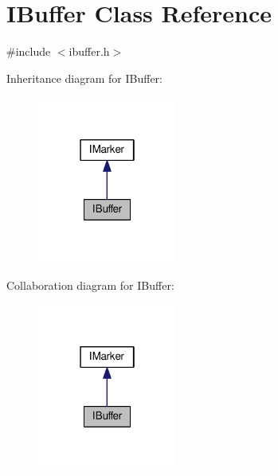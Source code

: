 \hypertarget{class_i_buffer}{\section{I\-Buffer Class Reference}
\label{class_i_buffer}
}


{\ttfamily \#include $<$ibuffer.\-h$>$}



Inheritance diagram for I\-Buffer\-:
\nopagebreak
\begin{figure}[H]
\begin{center}
\leavevmode
\includegraphics[width=130pt]{class_i_buffer__inherit__graph}
\end{center}
\end{figure}


Collaboration diagram for I\-Buffer\-:
\nopagebreak
\begin{figure}[H]
\begin{center}
\leavevmode
\includegraphics[width=130pt]{class_i_buffer__coll__graph}
\end{center}
\end{figure}
